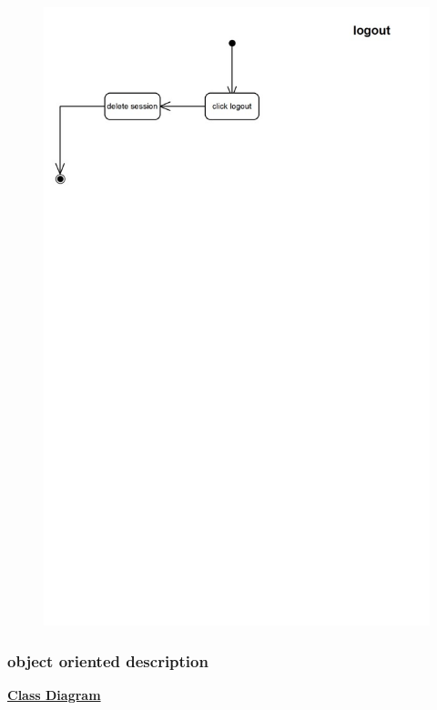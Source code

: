 \documentclass[]{article}
\begin{document}
\begin{figure}[H]
\centering
\includegraphics[scale=0.7]{./activity/27}
\end{figure}

\subsubsection{object oriented description}

\textbf{\underline{Class Diagram}}
\end{document}

